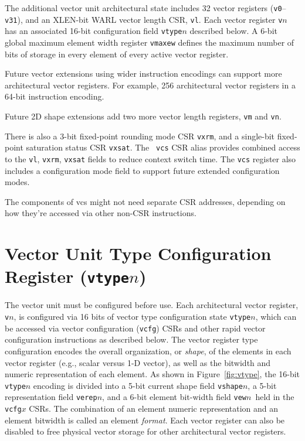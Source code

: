 The additional vector unit architectural state includes 32 vector
registers ({\tt v0}--{\tt v31}), and an XLEN-bit WARL vector length
CSR, {\tt vl}.  Each vector register {\tt v}$n$ has an associated
16-bit configuration field {\tt vtype}$n$ described below. A 6-bit
global maximum element width register {\tt vmaxew} defines the maximum
number of bits of storage in every element of every active vector
register.

\begin{commentary}
  Future vector extensions using wider instruction encodings can
  support more architectural vector registers. For example, 256
  architectural vector registers in a 64-bit instruction encoding.
\end{commentary}

\begin{commentary}
  Future 2D shape extensions add two more vector length registers,
  {\tt vm} and {\tt vn}.
\end{commentary}

There is also a 3-bit fixed-point rounding mode CSR {\tt vxrm}, and a
single-bit fixed-point saturation status CSR {\tt vxsat}.  The {\tt
  vcs} CSR alias provides combined access to the {\tt vl}, {\tt vxrm},
{\tt vxsat} fields to reduce context switch time.  The {\tt vcs}
register also includes a configuration mode field to support future
extended configuration modes.

\begin{discussion}
The components of vcs might not need separate CSR addresses,
depending on how they're accessed via other non-CSR instructions.
\end{discussion}

\section{Vector Unit Type Configuration Register ({\tt vtype}$n$)}

The vector unit must be configured before use.  Each architectural
vector register, {\tt v}$n$, is configured via 16 bits of vector type
configuration state {\tt vtype}$n$, which can be accessed via vector
configuration ({\tt vcfg}) CSRs and other rapid vector configuration
instructions as described below.  The vector register type
configuration encodes the overall organization, or {\em shape}, of the
elements in each vector register (e.g., scalar versus 1-D vector), as
well as the bitwidth and numeric representation of each element.  As
shown in Figure~\ref{fig:vtype}, the 16-bit {\tt vtype}$n$ encoding is
divided into a 5-bit current shape field {\tt vshape}$n$, a 5-bit
representation field {\tt verep}$n$, and a 6-bit element bit-width
field {\tt vew}$n$\, held in the {\tt vcfg}$x$ CSRs.  The combination
of an element numeric representation and an element bitwidth is called
an element {\em format}.  Each vector register can also be disabled to
free physical vector storage for other architectural vector registers.

